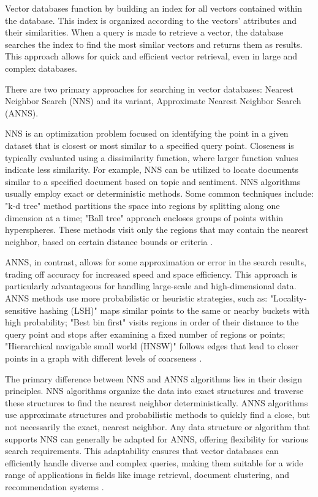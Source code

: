 Vector databases function by building an index for all vectors contained within the database. This index is organized according to the vectors' attributes and their similarities. When a query is made to retrieve a vector, the database searches the index to find the most similar vectors and returns them as results. This approach allows for quick and efficient vector retrieval, even in large and complex databases. 

There are two primary approaches for searching in vector databases: Nearest Neighbor Search (NNS) and its variant, Approximate Nearest Neighbor Search (ANNS).

NNS is an optimization problem focused on identifying the point in a given dataset that is closest or most similar to a specified query point. Closeness is typically evaluated using a dissimilarity function, where larger function values indicate less similarity. For example, NNS can be utilized to locate documents similar to a specified document based on topic and sentiment. NNS algorithms usually employ exact or deterministic methods. Some common techniques include: "k-d tree" method partitions the space into regions by splitting along one dimension at a time; "Ball tree" approach encloses groups of points within hyperspheres. These methods visit only the regions that may contain the nearest neighbor, based on certain distance bounds or criteria \cite{Han.18Oct2023}.

ANNS, in contrast, allows for some approximation or error in the search results, trading off accuracy for increased speed and space efficiency. This approach is particularly advantageous for handling large-scale and high-dimensional data. ANNS methods use more probabilistic or heuristic strategies, such as: "Locality-sensitive hashing (LSH)" maps similar points to the same or nearby buckets with high probability; "Best bin first" visits regions in order of their distance to the query point and stops after examining a fixed number of regions or points; "Hierarchical navigable small world (HNSW)" follows edges that lead to closer points in a graph with different levels of coarseness \cite{Han.18Oct2023}.

The primary difference between NNS and ANNS algorithms lies in their design principles. NNS algorithms organize the data into exact structures and traverse these structures to find the nearest neighbor deterministically. ANNS algorithms use approximate structures and probabilistic methods to quickly find a close, but not necessarily the exact, nearest neighbor.
Any data structure or algorithm that supports NNS can generally be adapted for ANNS, offering flexibility for various search requirements. This adaptability ensures that vector databases can efficiently handle diverse and complex queries, making them suitable for a wide range of applications in fields like image retrieval, document clustering, and recommendation systems \cite{Han.18Oct2023}.

